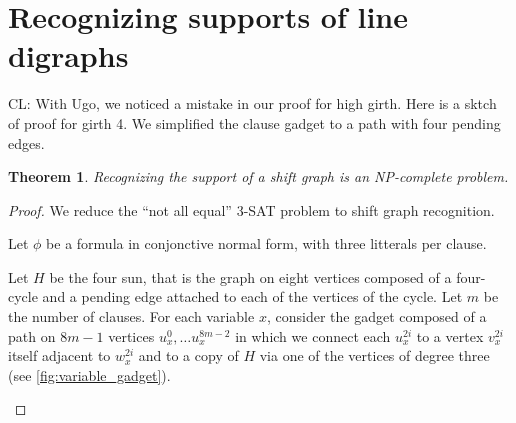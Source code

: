 \documentclass[11pt,a4aper]{article}
\newtheorem{theorem}{Theorem}
\theoremstyle{definition}
\newcommand{\clement}[1]{{\color{orange} CL: #1}}
\begin{document}
\section{Recognizing supports of line digraphs}
\clement{With Ugo, we noticed a mistake in our proof for high girth. Here is a
  sktch of proof for girth 4. We simplified the clause gadget to a path with
  four pending edges.}
\begin{theorem}
  Recognizing the support of a shift graph is an NP-complete problem.
\end{theorem}
\begin{proof}
  We reduce the ``not all equal'' 3-SAT problem to shift graph
  recognition.

  Let $\phi$ be a formula in conjonctive normal form, with three litterals per
  clause.

  Let $H$ be the four sun, that is the graph on eight vertices composed of a
  four-cycle and a pending edge attached to each of the vertices of the cycle.
  Let $m$ be the number of clauses. For each variable $x$, consider the
  gadget composed of a path on $8m-1$ vertices $u_x^0, \dots u_x^{8m-2}$ in which
  we connect each $u_x^{2i}$ to a vertex $v_x^{2i}$ itself adjacent to $w_x^{2i}$
  and to a copy of $H$ via one of the
  vertices of degree three (see \cref{fig:variable_gadget}).

  \begin{figure}[h!]
    \centering
\end{figure}
\end{proof}
\end{document}
